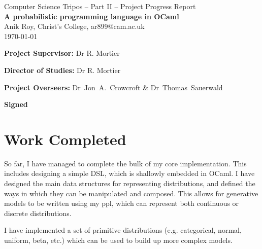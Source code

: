 \documentclass[12pt,a4paper]{article}
\begin{document}
\begin{center}
	{\Large Computer Science Tripos -- Part II -- Project Progress Report} \\
	\vspace{0.2in}
	{\huge \bf A probabilistic programming language in OCaml } \\
	\vspace{0.4in}
	{\large Anik Roy, Christ's College, ar899@cam.ac.uk} \\
	\vspace{0.1in}
	{\large \today} \\
																																						
\end{center}
\vspace{0.4in}


\vfil


\textbf{Project Supervisor:} Dr R. Mortier

\textbf{Director of Studies:} Dr R. Mortier

\textbf{Project Overseers:} Dr~Jon~A.~Crowcroft  \& Dr~Thomas~Sauerwald

\vfil

\noindent\textbf{Signed} 

\section*{Work Completed}

So far, I have managed to complete the bulk of my core implementation. This includes designing a simple DSL, which is shallowly embedded in OCaml. I have designed the main data structures for representing distributions, and defined the ways in which they can be manipulated and composed. This allows for generative models to be written using my ppl, which can represent both continuous or discrete distributions. 

I have implemented a set of primitive distributions (e.g. categorical, normal, uniform, beta, etc.) which can be used to build up more complex models.
\end{document}
